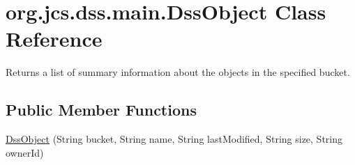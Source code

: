 \hypertarget{classorg_1_1jcs_1_1dss_1_1main_1_1DssObject}{}\section{org.\+jcs.\+dss.\+main.\+Dss\+Object Class Reference}
\label{classorg_1_1jcs_1_1dss_1_1main_1_1DssObject}


Returns a list of summary information about the objects in the specified bucket.  


\subsection*{Public Member Functions}
\begin{DoxyCompactItemize}
\item 
\hyperlink{classorg_1_1jcs_1_1dss_1_1main_1_1DssObject_adffda1fdd72a701240b5eb3d38062660}{Dss\+Object} (String bucket, String name, String last\+Modified, String size, String owner\+Id)\hypertarget{classorg_1_1jcs_1_1dss_1_1main_1_1DssObject_adffda1fdd72a701240b5eb3d38062660}{}\label{classorg_1_1jcs_1_1dss_1_1main_1_1DssObject_adffda1fdd72a701240b5eb3d38062660}


\end{DoxyCompactItemize}

